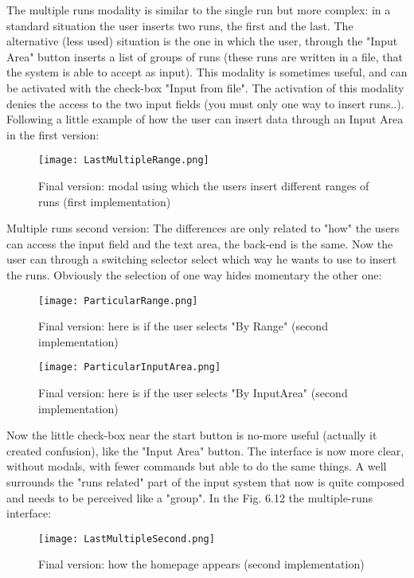 The multiple runs modality is similar to the single run but more complex: in a standard situation the user inserts two runs, the first and the last. The alternative (less used) situation is the one in which the user, through the "Input Area" button inserts a list of groups of runs (these runs are written in a file, that the system is able to accept as input). This modality is sometimes useful, and can be activated with the check-box "Input from file". The activation of this modality denies the access to the two input fields (you must only one way to insert runs..).
Following a little example of how the user can insert data through an Input Area in the first version:

\begin{figure}[H]
\centering
\texttt{[image: LastMultipleRange.png]} 
\caption{Final version: modal using which the users insert different ranges of runs (first implementation)}
\end{figure}   

Multiple runs second version:
The differences are only related to "how" the users can access the input field and the text area, the back-end is the same. Now the user can through a switching selector select which way he wants to use to insert the runs. Obviously the selection of one way hides momentary the other one:

\begin{figure}[H]
\centering
\texttt{[image: ParticularRange.png]} 
\caption{Final version: here is if the user selects "By Range" (second implementation)}
\end{figure}   

\begin{figure}[H]
\centering
\texttt{[image: ParticularInputArea.png]} 
\caption{Final version: here is if the user selects "By InputArea" (second implementation)}
\end{figure}   

Now the little check-box near the start button is no-more useful (actually it created confusion), like the "Input Area" button. The interface is now more clear, without modals, with fewer commands but able to do the same things. A well surrounds the "runs related" part of the input system that now is quite composed and needs to be perceived like a "group".
In the Fig. 6.12 the multiple-runs interface:

\begin{figure}[H]
\centering
\texttt{[image: LastMultipleSecond.png]} 
\caption{Final version: how the homepage appears (second implementation)}
\end{figure}  

